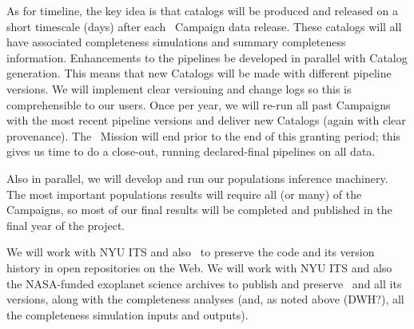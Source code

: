 \documentclass[12pt,preprint]{aastex}
\newcommand{\github}{\project{GitHub}}
\begin{document}
As for timeline, the key idea is that catalogs will be produced and
released on a short timescale (days) after each \kt\ Campaign data
release.
These catalogs will all have associated completeness simulations
and summary completeness information.
Enhancements to the pipelines be developed in parallel with Catalog
generation.
This means that new Catalogs will be made with different pipeline
versions.
We will implement clear versioning and change logs so this is
comprehensible to our users.
Once per year, we will re-run all past Campaigns with the most recent
pipeline versions and deliver new Catalogs (again with clear
provenance).
The \kt\ Mission will end prior to the end of this granting period;
this gives us time to do a close-out, running declared-final pipelines
on all data.

Also in parallel, we will develop and run our populations inference
machinery.
The most important populations results will require all (or many) of
the Campaigns, so most of our final results will be completed and
published in the final year of the project.

We will work with NYU ITS and also \github\ to preserve
the code and its version history in open repositories on the Web.
We will work with NYU ITS and also the NASA-funded exoplanet
science archives
to publish and preserve \thecatalog\ and all its versions, along with the
completeness analyses (and, as noted above (DWH?), all the
completeness simulation inputs and outputs).
\end{document}
